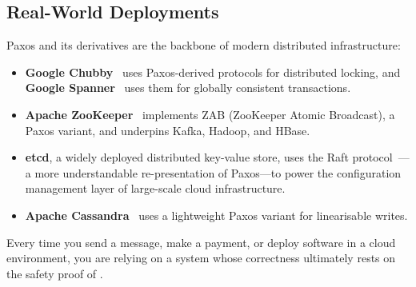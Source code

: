 \subsection{Real-World Deployments}

Paxos and its derivatives are the backbone of modern distributed infrastructure:

\begin{itemize}[nosep]
    \item \textbf{Google Chubby}~\cite{burrows2006} uses Paxos-derived protocols for distributed locking, and \textbf{Google Spanner}~\cite{corbett2012} uses them for globally consistent transactions.
    \item \textbf{Apache ZooKeeper}~\cite{hunt2010} implements ZAB (ZooKeeper Atomic Broadcast), a Paxos variant, and underpins Kafka, Hadoop, and HBase.
    \item \textbf{etcd}, a widely deployed distributed key-value store, uses the Raft protocol~\cite{ongaro2014}---a more understandable re-presentation of Paxos---to power the configuration management layer of large-scale cloud infrastructure.
    \item \textbf{Apache Cassandra}~\cite{lakshman2010} uses a lightweight Paxos variant for linearisable writes.
\end{itemize}

Every time you send a message, make a payment, or deploy software in a cloud environment, you are relying on a system whose correctness ultimately rests on the safety proof of .


